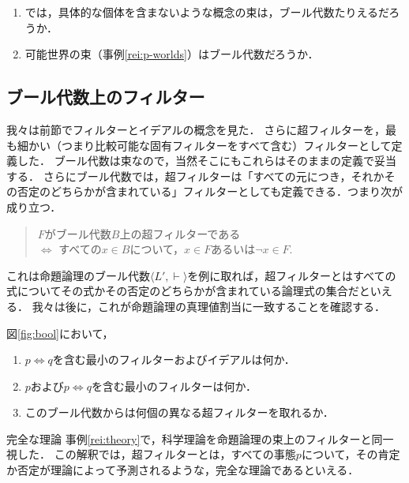 \documentclass[11pt,a4paper, dvipdfmx]{jsarticle}
\begin{document}
\begin{renshu}{}{}
    \begin{enumerate}
        \item では，具体的な個体を含まないような概念の束は，ブール代数たりえるだろうか．
        \item 可能世界の束（事例\ref{rei:p-worlds}）はブール代数だろうか．
    \end{enumerate}
\end{renshu}



\subsection{ブール代数上のフィルター}

我々は前節でフィルターとイデアルの概念を見た．
さらに超フィルターを，最も細かい（つまり比較可能な固有フィルターをすべて含む）フィルターとして定義した．
ブール代数は束なので，当然そこにもこれらはそのままの定義で妥当する．
さらにブール代数では，超フィルターは「すべての元につき，それかその否定のどちらかが含まれている」フィルターとしても定義できる．つまり次が成り立つ．
\begin{prop}{}{}
    \begin{quote}
        $F$がブール代数$B$上の超フィルターである 
        \\ $\iff$ すべての$x \in B$について，$x \in F$あるいは$\neg x \in F$.    
    \end{quote}
\end{prop}

これは命題論理のブール代数$\langle L', \vdash \rangle$を例に取れば，超フィルターとはすべての式についてその式かその否定のどちらかが含まれている論理式の集合だといえる．
我々は後に，これが命題論理の真理値割当に一致することを確認する．

\begin{renshu}{}{}
    図\ref{fig:bool}において，
    \begin{enumerate}
        \item $p \iff q$を含む最小のフィルターおよびイデアルは何か．
        \item $p$および$p \iff q$を含む最小のフィルターは何か．
        \item このブール代数からは何個の異なる超フィルターを取れるか．
    \end{enumerate}
\end{renshu}

\begin{rei}{完全な理論}{}
事例\ref{rei:theory}で，科学理論を命題論理の束上のフィルターと同一視した．
この解釈では，超フィルターとは，すべての事態$p$について，その肯定か否定が理論によって予測されるような，完全な理論であるといえる．
\end{rei}    
\end{document}
